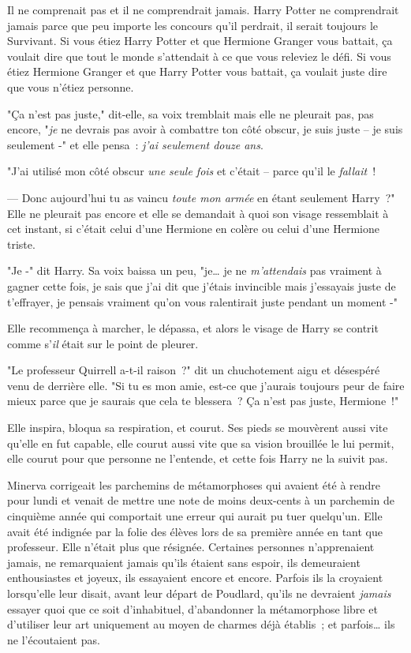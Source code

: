 Il ne comprenait pas et il ne comprendrait jamais. Harry Potter ne comprendrait jamais parce que peu importe les concours qu'il perdrait, il serait toujours le Survivant. Si vous étiez Harry Potter et que Hermione Granger vous battait, ça voulait dire que tout le monde s'attendait à ce que vous releviez le défi. Si vous étiez Hermione Granger et que Harry Potter vous battait, ça voulait juste dire que vous n'étiez personne.

"Ça n'est pas juste," dit-elle, sa voix tremblait mais elle ne pleurait pas, pas encore, "\emph{je} ne devrais pas avoir à combattre ton côté obscur, je suis juste -- je suis seulement -" et elle pensa~: \emph{j'ai seulement douze ans}.

"J'ai utilisé mon côté obscur \emph{une seule fois} et c'était -- parce qu'il le \emph{fallait}~!

--- Donc aujourd'hui tu as vaincu \emph{toute mon armée} en étant seulement Harry~?" Elle ne pleurait pas encore et elle se demandait à quoi son visage ressemblait à cet instant, si c'était celui d'une Hermione en colère ou celui d'une Hermione triste.

"Je -" dit Harry. Sa voix baissa un peu, "je… je ne \emph{m'attendais} pas vraiment à gagner cette fois, je sais que j'ai dit que j'étais invincible mais j'essayais juste de t'effrayer, je pensais vraiment qu'on vous ralentirait juste pendant un moment -"

Elle recommença à marcher, le dépassa, et alors le visage de Harry se contrit comme s'\emph{il} était sur le point de pleurer.

"Le professeur Quirrell a-t-il raison~?" dit un chuchotement aigu et désespéré venu de derrière elle. "Si tu es mon amie, est-ce que j'aurais toujours peur de faire mieux parce que je saurais que cela te blessera~? Ça n'est pas juste, Hermione~!"

Elle inspira, bloqua sa respiration, et courut. Ses pieds se mouvèrent aussi vite qu'elle en fut capable, elle courut aussi vite que sa vision brouillée le lui permit, elle courut pour que personne ne l'entende, et cette fois Harry ne la suivit pas.

\later

Minerva corrigeait les parchemins de métamorphoses qui avaient été à rendre pour lundi et venait de mettre une note de moins deux-cents à un parchemin de cinquième année qui comportait une erreur qui aurait pu tuer quelqu'un. Elle avait été indignée par la folie des élèves lors de sa première année en tant que professeur. Elle n'était plus que résignée. Certaines personnes n'apprenaient jamais, ne remarquaient jamais qu'ils étaient sans espoir, ils demeuraient enthousiastes et joyeux, ils essayaient encore et encore. Parfois ils la croyaient lorsqu'elle leur disait, avant leur départ de Poudlard, qu'ils ne devraient \emph{jamais} essayer quoi que ce soit d'inhabituel, d'abandonner la métamorphose libre et d'utiliser leur art uniquement au moyen de charmes déjà établis~; et parfois… ils ne l'écoutaient pas.

